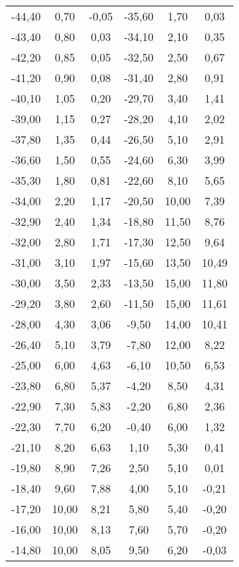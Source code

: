 \begin{table}[htp]
\begin{center}
\begin{tabular}{cccccc}
			-44,40 & 0,70 &-0,05 & -35,60 & 1,70 & 0,03\\
			-43,40 & 0,80 & 0,03 & -34,10 & 2,10 & 0,35\\
			-42,20 & 0,85 & 0,05 & -32,50 & 2,50 & 0,67\\
			-41,20 & 0,90 & 0,08 & -31,40 & 2,80 & 0,91\\
			-40,10 & 1,05 & 0,20 & -29,70 & 3,40 & 1,41\\
			-39,00 & 1,15 & 0,27 & -28,20 & 4,10 & 2,02\\
			-37,80 & 1,35 & 0,44 & -26,50 & 5,10 & 2,91\\
			-36,60 & 1,50 & 0,55 & -24,60 & 6,30 & 3,99\\
			-35,30 & 1,80 & 0,81 & -22,60 & 8,10 & 5,65\\
			-34,00 & 2,20 & 1,17 & -20,50 & 10,00& 7,39\\
			-32,90 & 2,40 & 1,34 & -18,80 & 11,50& 8,76\\
			-32,00 & 2,80 & 1,71 & -17,30 & 12,50& 9,64\\
			-31,00 & 3,10 & 1,97 & -15,60 & 13,50& 10,49\\
			-30,00 & 3,50 & 2,33 & -13,50 & 15,00& 11,80\\
			-29,20 & 3,80 & 2,60 & -11,50 & 15,00& 11,61\\
			-28,00 & 4,30 & 3,06 & 	-9,50 & 14,00& 10,41\\
			-26,40 & 5,10 & 3,79 & 	-7,80 & 12,00& 8,22\\
			-25,00 & 6,00 & 4,63 & 	-6,10 & 10,50& 6,53\\
			-23,80 & 6,80 & 5,37 & 	-4,20 & 8,50 & 4,31\\
			-22,90 & 7,30 & 5,83 & 	-2,20 & 6,80 & 2,36\\
			-22,30 & 7,70 & 6,20 & 	-0,40 & 6,00 & 1,32\\
			-21,10 & 8,20 & 6,63 & 	 1,10 & 5,30 & 0,41\\
			-19,80 & 8,90 & 7,26 & 	 2,50 & 5,10 & 0,01\\
			-18,40 & 9,60 & 7,88 & 	 4,00 & 5,10 & -0,21\\
			-17,20 & 10,00& 8,21 & 	 5,80 & 5,40 & -0,20\\
			-16,00 & 10,00& 8,13 & 	 7,60 & 5,70 & -0,20\\
			-14,80 & 10,00& 8,05 & 	 9,50 & 6,20 & -0,03\\
      \bottomrule
      \end{tabular}
    \end{center}
  \end{table}
